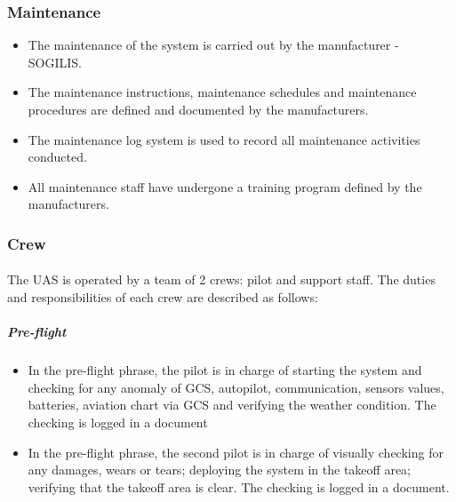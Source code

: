 \documentclass[]{article}
\begin{document}
	\subsubsection{Maintenance} 
	\begin{itemize}
		\item The maintenance of the system is carried out by the manufacturer - SOGILIS.
		\item The maintenance instructions, maintenance schedules and maintenance procedures are defined and documented by the manufacturers.
		\item  The maintenance log system is used to record all maintenance activities conducted.  
		\item All maintenance staff have undergone a training program defined by the manufacturers. 
	\end{itemize}
	
	\subsubsection{Crew}
	\paragraph{} The UAS is operated by a team of 2 crews: pilot and support staff. The duties and responsibilities  of each crew are described as follows:
	\subparagraph{Pre-flight}
	\begin{itemize}
		\item In the pre-flight phrase, the pilot is in charge of starting the system and checking for any anomaly  of GCS, autopilot, communication, sensors values, batteries, aviation chart via GCS and verifying the weather condition. The checking is logged in a document 
		\item In the pre-flight phrase, the second pilot is in charge of visually checking for any damages, wears or tears; deploying the system in the takeoff area; verifying that the takeoff area is clear. The checking is logged in a document. 
	\end{itemize}
\end{document}
